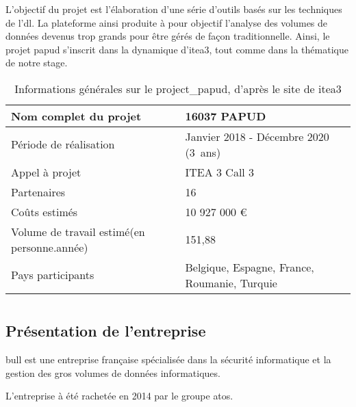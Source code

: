 L'objectif du projet  est l'élaboration d'une série d'outils basés sur les techniques de l'\gls{dl}.
La plateforme ainsi produite à pour objectif l'analyse des volumes de données devenus trop grands pour être gérés de façon traditionnelle.
Ainsi, le projet \gls{papud} s'inscrit dans la dynamique d'\gls{itea3}, tout comme dans la thématique de notre stage.

\begin{table}[h]{
	\centering
	\renewcommand{\arraystretch}{1.5}
	\setlength\tabcolsep{1em}
	\begin{tabularx}{\textwidth}{|X|l|}
		\hline
		Nom complet du projet & 16037 PAPUD\\
		\hline
		Période de réalisation & Janvier 2018 - Décembre 2020 (3~ans)\\
		\hline
		Appel à projet & ITEA 3 Call 3\\
		\hline
		Partenaires & 16\\
		\hline
		Coûts estimés & 10 927 000 €\\
		\hline
		Volume de travail estimé\newline (en personne.année) & 151,88 \\
		\hline
		Pays participants & Belgique, Espagne, France, \mbox{Roumanie}, Turquie\\
		\hline
	\end{tabularx}
	\renewcommand{\arraystretch}{1}}
	\caption[Informations générales sur le \gls{project_papud}, d'après le site de \gls{itea3}]{Informations générales sur le \gls{project_papud}, d'après le site de \gls{itea3} \autocite{about_papud} \label{tab:about_papud}}
\end{table}

\section{}
\subsection*{Présentation de l'entreprise}
\gls{bull} est une entreprise française spécialisée dans la sécurité informatique et la gestion des gros volumes de données informatiques. 

L'entreprise à été rachetée en 2014 par le groupe \gls{atos}.

